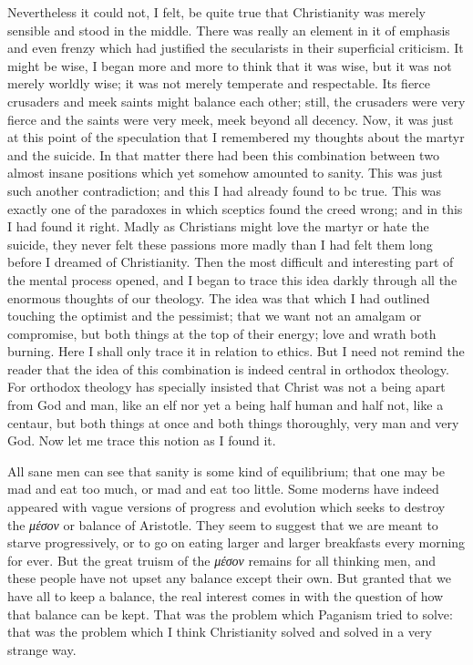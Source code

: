 \documentclass{book}
\begin{document}
Nevertheless it could not, I felt, be quite true that Christianity was merely sensible and stood in the middle. There was really an element in it of emphasis and even frenzy which had justified the secularists in their superficial criticism. It might be wise, I began more and more to think that it was wise, but it was not merely worldly wise; it was not merely temperate and respectable. Its fierce crusaders and meek saints might balance each other; still, the crusaders were very fierce and the saints were very meek, meek beyond all decency. Now, it was just at this point of the speculation that I remembered my thoughts about the martyr and the suicide. In that matter there had been this combination between two almost insane positions which yet somehow amounted to sanity. This was just such another contradiction; and this I had already found to bc true. This was exactly one of the paradoxes in which sceptics found the creed wrong; and in this I had found it right. Madly as Christians might love the martyr or hate the suicide, they never felt these passions more madly than I had felt them long before I dreamed of Christianity. Then the most difficult and interesting part of the mental process opened, and I began to trace this idea darkly through all the enormous thoughts of our theology. The idea was that which I had outlined touching the optimist and the pessimist; that we want not an amalgam or compromise, but both things at the top of their energy; love and wrath both burning. Here I shall only trace it in relation to ethics. But I need not remind the reader that the idea of this combination is indeed central in orthodox theology. For orthodox theology has specially insisted that Christ was not a being apart from God and man, like an elf nor yet a being half human and half not, like a centaur, but both things at once and both things thoroughly, very man and very God. Now let me trace this notion as I found it.

All sane men can see that sanity is some kind of equilibrium; that one may be mad and eat too much, or mad and eat too little. Some moderns have indeed appeared with vague versions of progress and evolution which seeks to destroy the \emph{μέσον} or balance of Aristotle. They seem to suggest that we are meant to starve progressively, or to go on eating larger and larger breakfasts every morning for ever. But the great truism of the \emph{μέσον} remains for all thinking men, and these people have not upset any balance except their own. But granted that we have all to keep a balance, the real interest comes in with the question of how that balance can be kept. That was the problem which Paganism tried to solve: that was the problem which I think Christianity solved and solved in a very strange way.
\end{document}
